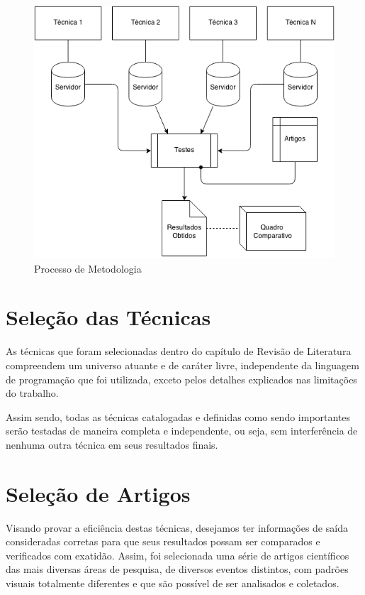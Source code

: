 \documentclass[
	12pt,               %
	openright,          %
	twoside,            %
	a4paper,            %
	english,            %
	brazil              %
	]{abntex2}
\begin{document}

\begin{figure}
\centering
\caption{Processo de Metodologia}
\label{fig:metodology}
\includegraphics[width=0.7\linewidth]{./assets/metodology}
\end{figure}


\section{Seleção das Técnicas}

As técnicas que foram selecionadas dentro do capítulo de Revisão de Literatura compreendem um universo atuante e de caráter livre, independente da linguagem de programação que foi utilizada, exceto pelos detalhes explicados nas limitações do trabalho.

Assim sendo, todas as técnicas catalogadas e definidas como sendo importantes serão testadas de maneira completa e independente, ou seja, sem interferência de nenhuma outra técnica em seus resultados finais.


\section{Seleção de Artigos}

Visando provar a eficiência destas técnicas, desejamos ter informações de saída consideradas corretas para que seus resultados possam ser comparados e verificados com exatidão. Assim, foi selecionada uma série de artigos científicos das mais diversas áreas de pesquisa, de diversos eventos distintos, com padrões visuais totalmente diferentes e que são possível de ser analisados e coletados.
\end{document}

